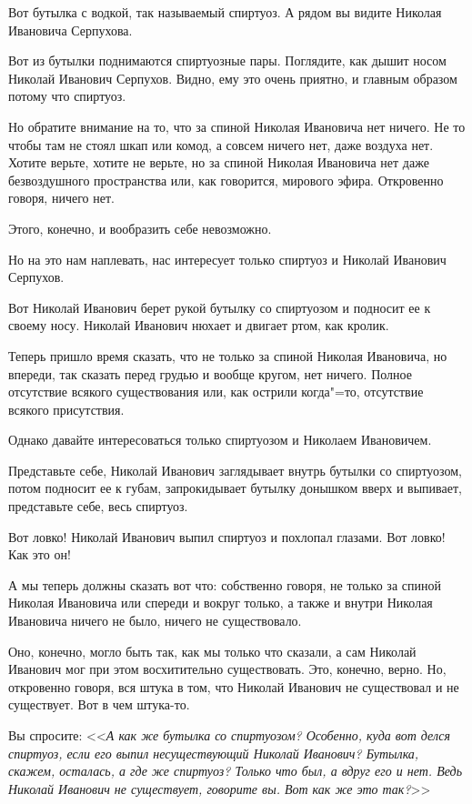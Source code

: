 
Вот бутылка с водкой, так называемый спиртуоз. А рядом вы видите Николая Ивановича Серпухова.

Вот из бутылки поднимаются спиртуозные пары. Поглядите, как дышит носом Николай Иванович Серпухов. Видно, ему это очень приятно, и главным образом потому что спиртуоз.

Но обратите внимание на то, что за спиной Николая Ивановича нет ничего. Не то чтобы там не стоял шкап или комод, а совсем ничего нет, даже воздуха нет. Хотите верьте, хотите не верьте, но за спиной Николая Ивановича нет даже безвоздушного пространства или, как говорится, мирового эфира. Откровенно говоря, ничего нет.

Этого, конечно, и вообразить себе невозможно.

Но на это нам наплевать, нас интересует только спиртуоз и Николай Иванович Серпухов.

Вот Николай Иванович берет рукой бутылку со спиртуозом и подносит ее к своему носу. Николай Иванович нюхает и двигает ртом, как кролик.

Теперь пришло время сказать, что не только за спиной Николая Ивановича, но впереди, так сказать перед грудью и вообще кругом, нет ничего. Полное отсутствие всякого существования или, как острили когда"=то, отсутствие всякого присутствия.

Однако давайте интересоваться только спиртуозом и Николаем Ивановичем.

Представьте себе, Николай Иванович заглядывает внутрь бутылки со спиртуозом, потом подносит ее к губам, запрокидывает бутылку донышком вверх и выпивает, представьте себе, весь спиртуоз.

Вот ловко! Николай Иванович выпил спиртуоз и похлопал глазами. Вот ловко! Как это он!

А мы теперь должны сказать вот что: собственно говоря, не только за спиной Николая Ивановича или спереди и вокруг только, а также и внутри Николая Ивановича ничего не было, ничего не существовало.

Оно, конечно, могло быть так, как мы только что сказали, а сам Николай Иванович мог при этом восхитительно существовать. Это, конечно, верно. Но, откровенно говоря, вся штука в том, что Николай Иванович не существовал и не существует. Вот в чем штука-то.

Вы спросите: <<\textit{А как же бутылка со спиртуозом? Особенно, куда вот делся спиртуоз, если его выпил несуществующий Николай Иванович? Бутылка, скажем, осталась, а где же спиртуоз? Только что был, а вдруг его и нет. Ведь Николай Иванович не существует, говорите вы. Вот как же это так?}>>

